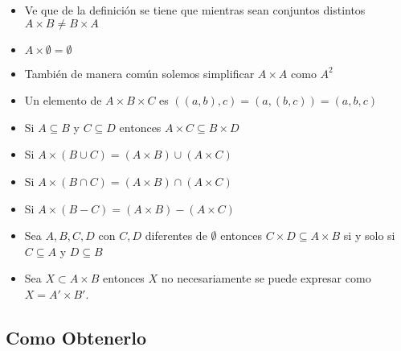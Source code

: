 \documentclass[12pt, fleqn]{report}                             %
\begin{document}
                \begin{itemize}
                    \item Ve que de la definición se tiene que mientras sean conjuntos distintos 
                        $ A \times B \neq B \times A$

                    \item $A \times \emptyset = \emptyset$

                    \item También de manera común solemos simplificar $A \times A$ como $A^2$

                    \item Un elemento de $A \times B \times C$ es $((a,b),c) = (a,(b,c)) = (a,b,c)$

                    \item Si $A \subseteq B$ y $C \subseteq D$ entonces $A \times C \subseteq B \times D$ 

                    \item Si $A \times (B \cup C) = (A \times B) \cup (A \times C)$ 

                    \item Si $A \times (B \cap C) = (A \times B) \cap (A \times C)$ 

                    \item Si $A \times (B - C) = (A \times B) - (A \times C)$

                    \item Sea $A, B, C, D$ con $C, D$ diferentes de $\emptyset$
                        entonces $C \times D \subseteq A \times B$ si y solo si $C \subseteq A$
                        y $D \subseteq B$

                    \item Sea $X \subset A \times B$ entonces $X$ no necesariamente se puede expresar
                    como $X = A' \times B'$.


                \end{itemize}



            \clearpage
            \subsection{Como Obtenerlo}
\end{document}
